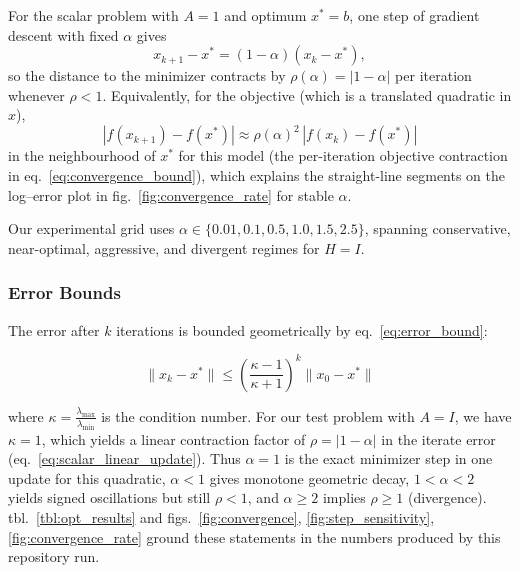 \documentclass[
  english,
]{article}
\begin{document}
For the scalar problem with \(A = 1\) and optimum \(x^\ast = b\), one
step of gradient descent with fixed \(\alpha\) gives \begin{equation}
\label{eq:scalar_linear_update}
x_{k+1} - x^\ast = (1 - \alpha)(x_k - x^\ast),
\end{equation} so the distance to the minimizer contracts by
\(\rho(\alpha) = |1 - \alpha|\) per iteration whenever \(\rho < 1\).
Equivalently, for the objective (which is a translated quadratic in
\(x\)), \begin{equation}
\label{eq:convergence_bound}
|f(x_{k+1}) - f(x^\ast)| \approx \rho(\alpha)^2 \, |f(x_k) - f(x^\ast)|
\end{equation} in the neighbourhood of \(x^\ast\) for this model (the
per-iteration objective contraction in eq.~\ref{eq:convergence_bound}),
which explains the straight-line segments on the log--error plot in
fig.~\ref{fig:convergence_rate} for stable \(\alpha\).

Our experimental grid uses
\(\alpha \in \{0.01, 0.1, 0.5, 1.0, 1.5, 2.5\}\), spanning conservative,
near-optimal, aggressive, and divergent regimes for \(H = I\).

\subsubsection{Error Bounds}\label{error-bounds}

The error after \(k\) iterations is bounded geometrically by
eq.~\ref{eq:error_bound}:

\begin{equation}
\label{eq:error_bound}
\|x_k - x^*\| \leq \left(\frac{\kappa - 1}{\kappa + 1}\right)^k \|x_0 - x^*\|
\end{equation}

where \(\kappa = \frac{\lambda_{\max}}{\lambda_{\min}}\) is the
condition number. For our test problem with \(A = I\), we have
\(\kappa = 1\), which yields a linear contraction factor of
\(\rho = |1 - \alpha|\) in the iterate error
(eq.~\ref{eq:scalar_linear_update}). Thus \(\alpha = 1\) is the exact
minimizer step in one update for this quadratic, \(\alpha < 1\) gives
monotone geometric decay, \(1 < \alpha < 2\) yields signed oscillations
but still \(\rho < 1\), and \(\alpha \geq 2\) implies \(\rho \geq 1\)
(divergence). tbl.~\ref{tbl:opt_results} and
figs.~\ref{fig:convergence}, \ref{fig:step_sensitivity}, \ref{fig:convergence_rate}
ground these statements in the numbers produced by this repository run.
\end{document}
